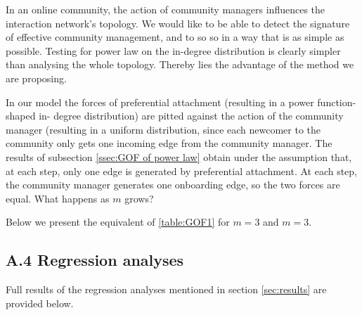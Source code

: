 \documentclass{nws}
\begin{document}
In an online community, the action of community managers influences the interaction network's topology. We would like to be able to detect the signature of effective community management, and to so so in a way that is as simple as possible. Testing for power law on the in-degree distribution is clearly simpler than analysing the whole topology. Thereby lies the advantage of the method we are proposing. 

In our model the forces of preferential attachment (resulting in a power function-shaped in- degree distribution) are pitted against the action of the community manager (resulting in a uniform distribution, since each newcomer to the community only gets one incoming edge from the community manager. The results of subsection \ref{ssec:GOF of power law} obtain under the assumption that, at each step, only one edge is generated by preferential attachment. At each step, the community manager generates one onboarding edge, so the two forces are equal. What happens as $m$ grows? 

Below we present the equivalent of \ref{table:GOF1} for $m = 3$ and $m = 3$.



\subsection*{A.4 Regression analyses}

Full results of the regression analyses mentioned in section \ref{sec:results} are provided below.
\end{document}
